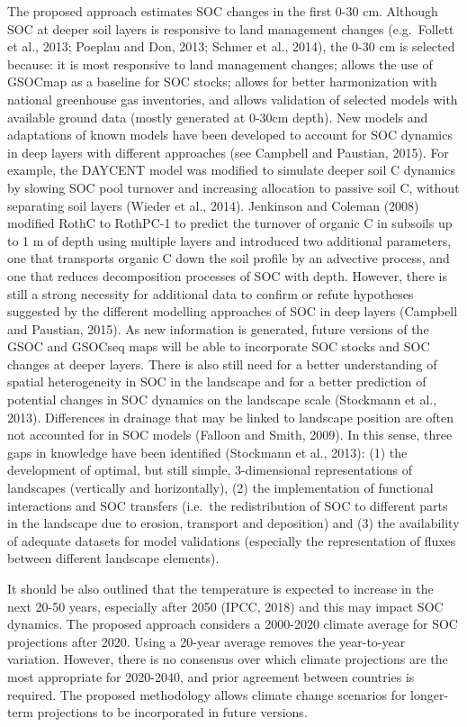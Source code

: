 \documentclass[
  10pt,
  b5paper,
]{book}
\begin{document}
The proposed approach estimates SOC changes in the first 0-30 cm. Although SOC at deeper soil layers is responsive to land management changes (e.g.~Follett et al., 2013; Poeplau and Don, 2013; Schmer et al., 2014), the 0-30 cm is selected because: it is most responsive to land management changes; allows the use of GSOCmap as a baseline for SOC stocks; allows for better harmonization with national greenhouse gas inventories, and allows validation of selected models with available ground data (mostly generated at 0-30cm depth). New models and adaptations of known models have been developed to account for SOC dynamics in deep layers with different approaches (see Campbell and Paustian, 2015). For example, the DAYCENT model was modified to simulate deeper soil C dynamics by slowing SOC pool turnover and increasing allocation to passive soil C, without separating soil layers (Wieder et al., 2014). Jenkinson and Coleman (2008) modified RothC to RothPC-1 to predict the turnover of organic C in subsoils up to 1 m of depth using multiple layers and introduced two additional parameters, one that transports organic C down the soil profile by an advective process, and one that reduces decomposition processes of SOC with depth. However, there is still a strong necessity for additional data to confirm or refute hypotheses suggested by the different modelling approaches of SOC in deep layers (Campbell and Paustian, 2015). As new information is generated, future versions of the GSOC and GSOCseq maps will be able to incorporate SOC stocks and SOC changes at deeper layers.
There is also still need for a better understanding of spatial heterogeneity in SOC in the landscape and for a better prediction of potential changes in SOC dynamics on the landscape scale (Stockmann et al., 2013). Differences in drainage that may be linked to landscape position are often not accounted for in SOC models (Falloon and Smith, 2009). In this sense, three gaps in knowledge have been identified (Stockmann et al., 2013): (1) the development of optimal, but still simple, 3-dimensional representations of landscapes (vertically and horizontally), (2) the implementation of functional interactions and SOC transfers (i.e.~the redistribution of SOC to different parts in the landscape due to erosion, transport and deposition) and (3) the availability of adequate datasets for model validations (especially the representation of fluxes between different landscape elements).

It should be also outlined that the temperature is expected to increase in the next 20-50 years, especially after 2050 (IPCC, 2018) and this may impact SOC dynamics. The proposed approach considers a 2000-2020 climate average for SOC projections after 2020. Using a 20-year average removes the year-to-year variation. However, there is no consensus over which climate projections are the most appropriate for 2020-2040, and prior agreement between countries is required. The proposed methodology allows climate change scenarios for longer-term projections to be incorporated in future versions.
\end{document}
